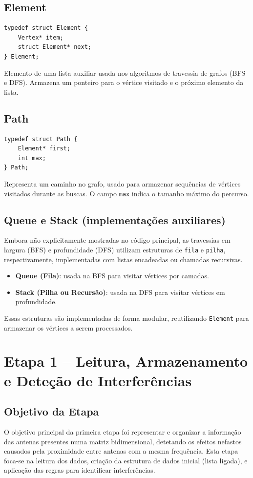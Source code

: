 \documentclass[a4paper,12pt]{article}
\begin{document}
\subsection{Element}
\begin{lstlisting}[style=CStyle]
typedef struct Element {
    Vertex* item;
    struct Element* next;
} Element;
\end{lstlisting}
Elemento de uma lista auxiliar usada nos algoritmos de travessia de grafos (BFS e DFS). Armazena um ponteiro para o vértice visitado e o próximo elemento da lista.

\subsection{Path}
\begin{lstlisting}[style=CStyle]
typedef struct Path {
    Element* first;
    int max;
} Path;
\end{lstlisting}
Representa um caminho no grafo, usado para armazenar sequências de vértices visitados durante as buscas. O campo \texttt{max} indica o tamanho máximo do percurso.

\subsection{Queue e Stack (implementações auxiliares)}
Embora não explicitamente mostradas no código principal, as travessias em largura (BFS) e profundidade (DFS) utilizam estruturas de \texttt{fila} e \texttt{pilha}, respectivamente, implementadas com listas encadeadas ou chamadas recursivas.

\begin{itemize}
    \item \textbf{Queue (Fila)}: usada na BFS para visitar vértices por camadas.
    \item \textbf{Stack (Pilha ou Recursão)}: usada na DFS para visitar vértices em profundidade.
\end{itemize}

Essas estruturas são implementadas de forma modular, reutilizando \texttt{Element} para armazenar os vértices a serem processados.

\newpage

\section{Etapa 1 – Leitura, Armazenamento e Deteção de Interferências}

\subsection{Objetivo da Etapa}
O objetivo principal da primeira etapa foi representar e organizar a informação das antenas presentes numa matriz bidimensional, detetando os efeitos nefastos causados pela proximidade entre antenas com a mesma frequência. Esta etapa foca-se na leitura dos dados, criação da estrutura de dados inicial (lista ligada), e aplicação das regras para identificar interferências.
\end{document}

